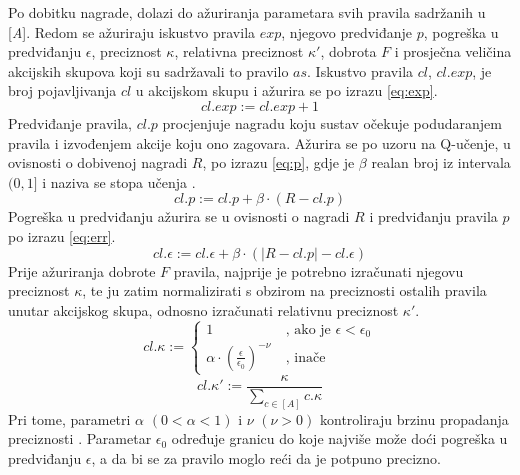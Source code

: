 \documentclass[times, utf8, zavrsni]{fer}
\begin{document}
Po dobitku nagrade, dolazi do ažuriranja parametara svih pravila sadržanih u [\emph{A}].
Redom se ažuriraju iskustvo pravila  $exp$, njegovo predviđanje  $p$, pogreška u predviđanju  $\epsilon$, preciznost  $\kappa$, relativna preciznost  $\kappa'$, dobrota $F$ i prosječna veličina akcijskih skupova koji su sadržavali to pravilo  $as$.
Iskustvo pravila $cl$, $cl.exp$, je broj pojavljivanja $cl$ u akcijskom skupu i ažurira se po izrazu \eqref{eq:exp}.
\begin{equation}
    \label{eq:exp}
    cl.exp := cl.exp + 1
\end{equation}
Predviđanje pravila, $cl.p$ procjenjuje nagradu koju sustav očekuje podudaranjem pravila i izvođenjem akcije koju ono zagovara.
Ažurira se po uzoru na Q-učenje, u ovisnosti o dobivenoj nagradi $R$, po izrazu \eqref{eq:p}, gdje je $\beta$ realan broj iz intervala $(0, 1]$ i naziva se stopa učenja .
\begin{equation}
    \label{eq:p}
    cl.p := cl.p + \beta \cdot (R - cl.p)
\end{equation}
Pogreška u predviđanju ažurira se u ovisnosti o nagradi $R$ i predviđanju pravila $p$ po izrazu \eqref{eq:err}.
\begin{equation}
    \label{eq:err}
    cl.\epsilon := cl.\epsilon + \beta \cdot (|R - cl.p| - cl.\epsilon)
\end{equation}
Prije ažuriranja dobrote $F$ pravila, najprije je potrebno izračunati njegovu preciznost $\kappa$, te ju zatim normalizirati s obzirom na preciznosti ostalih pravila unutar akcijskog skupa, odnosno izračunati relativnu preciznost $\kappa'$.
\begin{equation}
    \label{eq:acc}
    cl.\kappa :=
    \begin{cases}
        1 &\ \mbox{, ako je } \epsilon < \epsilon_{0} \\
        \alpha \cdot \left( \frac{\epsilon}{\epsilon_{0}} \right)^{-\nu} &\ \mbox{, inače}
    \end{cases}
\end{equation}
\begin{equation}
    \label{eq:racc}
    cl.\kappa' := \frac{\kappa}{\sum_{c \in [A]} c.\kappa}
\end{equation}
Pri tome, parametri $\alpha$ $(0 < \alpha < 1)$ i $\nu$ $(\nu > 0)$ kontroliraju brzinu propadanja preciznosti \citep{5}.
Parametar $\epsilon_{0}$ određuje granicu do koje najviše može doći pogreška u predviđanju $\epsilon$, a da bi se za pravilo moglo reći da je potpuno precizno.
\end{document}
